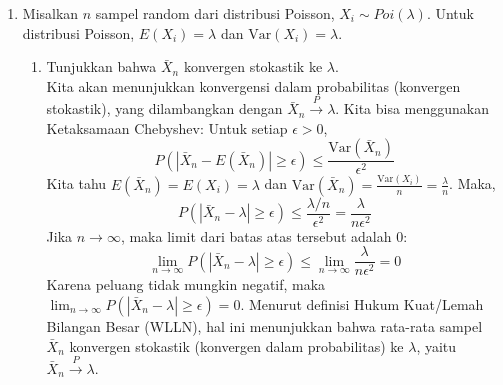 \documentclass[11pt,letterpaper]{article}
\begin{document}
\begin{enumerate}
\begin{enumerate}[label=\alph*)]
    \item Dapatkan peluang total berat 100 bagasi paling sedikit 6025 kg.
    Misalkan $S = \sum_{i=1}^{100} y_i$ adalah total berat bagasi. 
    Karena $n=100$ (cukup besar), berdasarkan Teorema Limit Pusat (CLT), distribusi total $S$ mendekati distribusi Normal dengan rata-rata $\mu_S = 6000$ dan variansi $\sigma_S^2 = 24000$.
    Sehingga $S \sim N(6000, 24000)$ secara asimtotik.
    Peluang $S \ge 6025$ adalah:
    \begin{align*}
      P(S \ge 6025) &= P\left( \frac{S - 6000}{\sqrt{24000}} \ge \frac{6025 - 6000}{\sqrt{24000}} \right) \\
      &\approx P\left( Z \ge \frac{25}{\sqrt{24000}} \right) \\
      &= P\left( Z \ge \frac{25}{154.919} \right) \\
      &\approx P(Z \ge 0.161)
    \end{align*}
    Dari tabel distribusi Normal Standar, $P(Z \le 0.16) \approx 0.5636$.
    Maka,
    \[ P(Z \ge 0.161) = 1 - P(Z \le 0.161) \approx 1 - 0.5636 = 0.4364 \]
    Jadi, peluang total berat 100 bagasi paling sedikit 6025 kg adalah sekitar 0.4364 atau 43.64\%.
  \end{enumerate}

  \item
  Misalkan $n$ sampel random dari distribusi Poisson, $X_i \sim Poi(\lambda)$.
  Untuk distribusi Poisson, $E(X_i) = \lambda$ dan $\text{Var}(X_i) = \lambda$.
  \begin{enumerate}[label=\alph*)]
    \item Tunjukkan bahwa $\bar{X}_n$ konvergen stokastik ke $\lambda$. \\
    Kita akan menunjukkan konvergensi dalam probabilitas (konvergen stokastik), yang dilambangkan dengan $\bar{X}_n \xrightarrow{P} \lambda$.
    Kita bisa menggunakan Ketaksamaan Chebyshev:
    Untuk setiap $\epsilon > 0$,
    \[ P(|\bar{X}_n - E(\bar{X}_n)| \ge \epsilon) \le \frac{\text{Var}(\bar{X}_n)}{\epsilon^2} \]
    Kita tahu $E(\bar{X}_n) = E(X_i) = \lambda$ dan $\text{Var}(\bar{X}_n) = \frac{\text{Var}(X_i)}{n} = \frac{\lambda}{n}$.
    Maka,
    \[ P(|\bar{X}_n - \lambda| \ge \epsilon) \le \frac{\lambda/n}{\epsilon^2} = \frac{\lambda}{n \epsilon^2} \]
    Jika $n \to \infty$, maka limit dari batas atas tersebut adalah 0:
    \[ \lim_{n \to \infty} P(|\bar{X}_n - \lambda| \ge \epsilon) \le \lim_{n \to \infty} \frac{\lambda}{n \epsilon^2} = 0 \]
    Karena peluang tidak mungkin negatif, maka $\lim_{n \to \infty} P(|\bar{X}_n - \lambda| \ge \epsilon) = 0$.
    Menurut definisi Hukum Kuat/Lemah Bilangan Besar (WLLN), hal ini menunjukkan bahwa rata-rata sampel $\bar{X}_n$ konvergen stokastik (konvergen dalam probabilitas) ke $\lambda$, yaitu $\bar{X}_n \xrightarrow{P} \lambda$.


\end{enumerate}
\end{enumerate}
\end{document}
